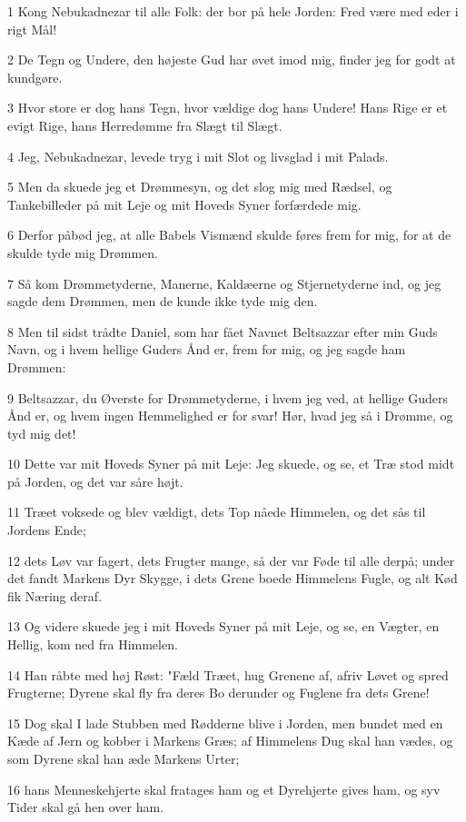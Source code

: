 \par 1 Kong Nebukadnezar til alle Folk: der bor på hele Jorden: Fred være med eder i rigt Mål!
\par 2 De Tegn og Undere, den højeste Gud har øvet imod mig, finder jeg for godt at kundgøre.
\par 3 Hvor store er dog hans Tegn, hvor vældige dog hans Undere! Hans Rige er et evigt Rige, hans Herredømme fra Slægt til Slægt.
\par 4 Jeg, Nebukadnezar, levede tryg i mit Slot og livsglad i mit Palads.
\par 5 Men da skuede jeg et Drømmesyn, og det slog mig med Rædsel, og Tankebilleder på mit Leje og mit Hoveds Syner forfærdede mig.
\par 6 Derfor påbød jeg, at alle Babels Vismænd skulde føres frem for mig, for at de skulde tyde mig Drømmen.
\par 7 Så kom Drømmetyderne, Manerne, Kaldæerne og Stjernetyderne ind, og jeg sagde dem Drømmen, men de kunde ikke tyde mig den.
\par 8 Men til sidst trådte Daniel, som har fået Navnet Beltsazzar efter min Guds Navn, og i hvem hellige Guders Ånd er, frem for mig, og jeg sagde ham Drømmen:
\par 9 Beltsazzar, du Øverste for Drømmetyderne, i hvem jeg ved, at hellige Guders Ånd er, og hvem ingen Hemmelighed er for svar! Hør, hvad jeg så i Drømme, og tyd mig det!
\par 10 Dette var mit Hoveds Syner på mit Leje: Jeg skuede, og se, et Træ stod midt på Jorden, og det var såre højt.
\par 11 Træet voksede og blev vældigt, dets Top nåede Himmelen, og det sås til Jordens Ende;
\par 12 dets Løv var fagert, dets Frugter mange, så der var Føde til alle derpå; under det fandt Markens Dyr Skygge, i dets Grene boede Himmelens Fugle, og alt Kød fik Næring deraf.
\par 13 Og videre skuede jeg i mit Hoveds Syner på mit Leje, og se, en Vægter, en Hellig, kom ned fra Himmelen.
\par 14 Han råbte med høj Røst: "Fæld Træet, hug Grenene af, afriv Løvet og spred Frugterne; Dyrene skal fly fra deres Bo derunder og Fuglene fra dets Grene!
\par 15 Dog skal I lade Stubben med Rødderne blive i Jorden, men bundet med en Kæde af Jern og kobber i Markens Græs; af Himmelens Dug skal han vædes, og som Dyrene skal han æde Markens Urter;
\par 16 hans Menneskehjerte skal fratages ham og et Dyrehjerte gives ham, og syv Tider skal gå hen over ham.
